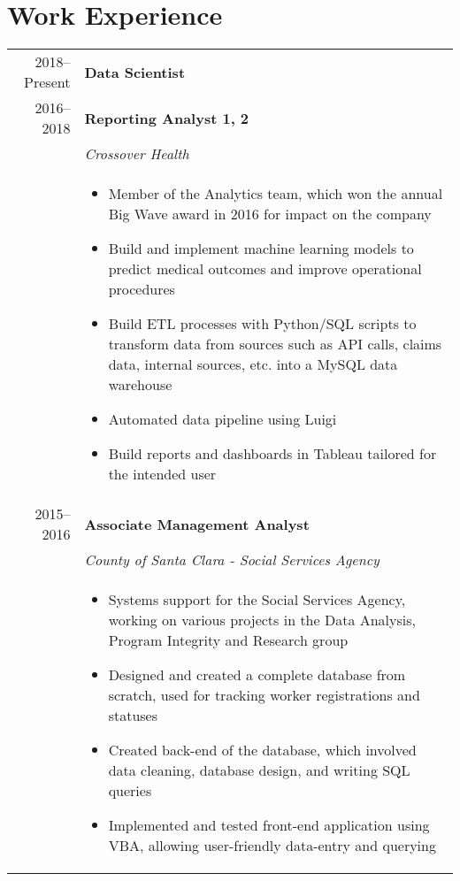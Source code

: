 \documentclass[letterpaper,10pt]{article}
\begin{document}
\nopagebreak
\section{Work Experience}
\begin{tabular}{rp{13cm}}
 	2018--Present & \textbf{Data Scientist} \\
	2016--2018	&	\textbf{Reporting Analyst 1, 2} \\
		& \emph{Crossover Health} \\
		& 
			\begin{itemize}
            \item Member of the Analytics team, which won the annual Big Wave award in 2016 for impact on the company
			\item Build and implement machine learning models to predict medical outcomes and improve operational procedures %
			\item Build ETL processes with Python/SQL scripts to transform data from sources such as API calls, claims data, internal sources, etc. into a MySQL data warehouse  
			\item Automated data pipeline using Luigi
			\item Build reports and dashboards in Tableau tailored for the intended user
			\end{itemize}\\
	2015--2016 & \textbf{Associate Management Analyst} \\
 		& \emph{County of Santa Clara - Social Services Agency}\\
		& 
			\begin{itemize}
			\item Systems support for the Social Services Agency, working on various projects in the Data Analysis, Program Integrity and Research group
			\item Designed and created a complete database from scratch, used for tracking worker registrations and statuses
			\item Created back-end of the database, which involved data cleaning, database design, and writing SQL queries
			\item Implemented and tested front-end application using VBA, allowing user-friendly data-entry and querying
			\end{itemize} \\

\end{tabular}
\end{document}

